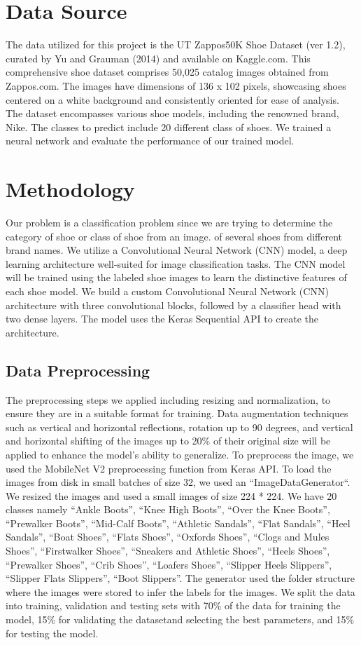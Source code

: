 \documentclass[11pt,a4paper]{article}
\begin{document}
		
\section{Data Source} 
The data utilized for this project is the UT Zappos50K Shoe Dataset (ver 1.2), curated by Yu and Grauman (2014) and available on Kaggle.com. This comprehensive shoe dataset comprises 50,025 catalog images obtained from Zappos.com. The images have dimensions of 136 x 102 pixels, showcasing shoes centered on a white background and consistently oriented for ease of analysis. The dataset encompasses various shoe models, including the renowned brand, Nike. The classes to predict include 20 different class of shoes.  We trained a neural network and evaluate the performance of our trained model.  
		
\section{Methodology} 
Our problem is a classification problem since we are trying to determine the category of shoe or class of shoe from an image. of several shoes from different brand names. We utilize a Convolutional Neural Network (CNN) model, a deep learning architecture well-suited for image classification tasks. The CNN model will be trained using the labeled shoe images to learn the distinctive features of each shoe model. We build a custom Convolutional Neural Network (CNN) architecture with three convolutional blocks, followed by a classifier head with two dense layers. The model uses the Keras Sequential API to create the architecture.
\subsection{Data Preprocessing}
The preprocessing steps we applied including resizing and normalization, to ensure they are in a suitable format for training. Data augmentation techniques such as vertical and horizontal reflections, rotation up to 90 degrees, and vertical and horizontal shifting of the images up to 20\% of their original size will be applied to enhance the model's ability to generalize.  To preprocess the image, we used the MobileNet V2 preprocessing function from Keras API.  To load the images from disk in small batches of size 32, we used an ``ImageDataGenerator``.  We resized the images and used a small images of size 224 * 224. We have 20 classes namely ``Ankle Boots'', ``Knee High Boots'', ``Over the Knee Boots'', ``Prewalker Boots'', ``Mid-Calf Boots'', ``Athletic Sandals'', ``Flat Sandals'', ``Heel Sandals'', ``Boat Shoes'', ``Flats Shoes'', ``Oxfords Shoes'', ``Clogs and Mules Shoes'',  ``Firstwalker Shoes'', ``Sneakers and Athletic Shoes'', ``Heels Shoes'', ``Prewalker Shoes'', ``Crib Shoes'', ``Loafers Shoes'', ``Slipper Heels Slippers'', ``Slipper Flats Slippers'', ``Boot Slippers''. The generator used the folder structure where the images were stored to infer the labels for the images. We split the data into training, validation and testing sets with 70\% of the data for training the model, 15\% for validating the datasetand selecting the best parameters, and 15\% for testing the model. 
\end{document}
